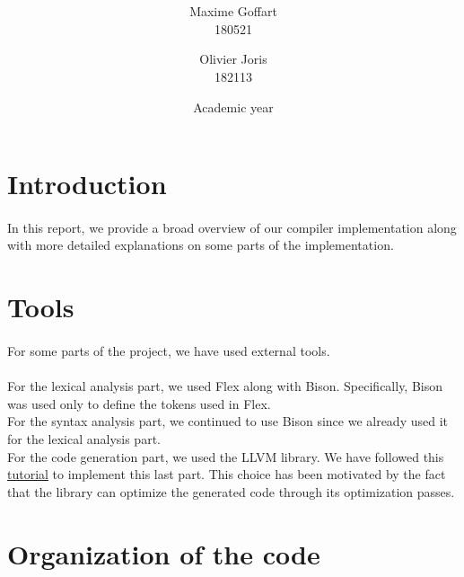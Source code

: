 \documentclass[a4paper, 11pt, oneside]{article}
\title{\ClassName\\\vspace*{0.8cm}\ProjectName\vspace{1cm}}
\author{Maxime Goffart \\180521 \and Olivier Joris\\182113}
\date{\vspace{1cm}Academic year \AcademicYear}
\begin{document}

\begin{titlingpage}
{\let\newpage\relax\maketitle}
\end{titlingpage}

\newpage


\section{Introduction}
\paragraph{}In this report, we provide a broad overview of our compiler implementation along with more detailed explanations on some parts of the implementation.


\section{Tools}
\paragraph{}For some parts of the project, we have used external tools.

\paragraph{}For the lexical analysis part, we used Flex along with Bison. Specifically, Bison was used only to define the tokens used in Flex.\\
For the syntax analysis part, we continued to use Bison since we already used it for the lexical analysis part.\\
For the code generation part, we used the LLVM library. We have followed this \href{https://mukulrathi.com/create-your-own-programming-language/llvm-ir-cpp-api-tutorial/}{tutorial} to implement this last part. This choice
has been motivated by the fact that the library can optimize the generated code through its optimization passes.

\section{Organization of the code} \label{codeOrg}
\end{document}
